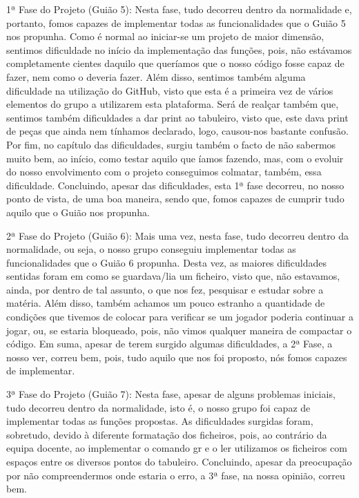 1ª Fase do Projeto (Guião 5)\+: Nesta fase, tudo decorreu dentro da normalidade e, portanto, fomos capazes de implementar todas as funcionalidades que o Guião 5 nos propunha. Como é normal ao iniciar-\/se um projeto de maior dimensão, sentimos dificuldade no início da implementação das funções, pois, não estávamos completamente cientes daquilo que queríamos que o nosso código fosse capaz de fazer, nem como o deveria fazer. Além disso, sentimos também alguma dificuldade na utilização do Git\+Hub, visto que esta é a primeira vez de vários elementos do grupo a utilizarem esta plataforma. Será de realçar também que, sentimos também dificuldades a dar print ao tabuleiro, visto que, este dava print de peças que ainda nem tínhamos declarado, logo, causou-\/nos bastante confusão. Por fim, no capítulo das dificuldades, surgiu também o facto de não sabermos muito bem, ao início, como testar aquilo que íamos fazendo, mas, com o evoluir do nosso envolvimento com o projeto conseguimos colmatar, também, essa dificuldade. Concluindo, apesar das dificuldades, esta 1ª fase decorreu, no nosso ponto de vista, de uma boa maneira, sendo que, fomos capazes de cumprir tudo aquilo que o Guião nos propunha.

2ª Fase do Projeto (Guião 6)\+: Mais uma vez, nesta fase, tudo decorreu dentro da normalidade, ou seja, o nosso grupo conseguiu implementar todas as funcionalidades que o Guião 6 propunha. Desta vez, as maiores dificuldades sentidas foram em como se guardava/lia um ficheiro, visto que, não estavamos, ainda, por dentro de tal assunto, o que nos fez, pesquisar e estudar sobre a matéria. Além disso, também achamos um pouco estranho a quantidade de condições que tivemos de colocar para verificar se um jogador poderia continuar a jogar, ou, se estaria bloqueado, pois, não vimos qualquer maneira de compactar o código. Em suma, apesar de terem surgido algumas dificuldades, a 2ª Fase, a nosso ver, correu bem, pois, tudo aquilo que nos foi proposto, nós fomos capazes de implementar.

3ª Fase do Projeto (Guião 7)\+: Nesta fase, apesar de alguns problemas iniciais, tudo decorreu dentro da normalidade, isto é, o nosso grupo foi capaz de implementar todas as funções propostas. As dificuldades surgidas foram, sobretudo, devido à diferente formatação dos ficheiros, pois, ao contrário da equipa docente, ao implementar o comando gr e o ler utilizamos os ficheiros com espaços entre os diversos pontos do tabuleiro. Concluindo, apesar da preocupação por não compreendermos onde estaria o erro, a 3ª fase, na nossa opinião, correu bem. 